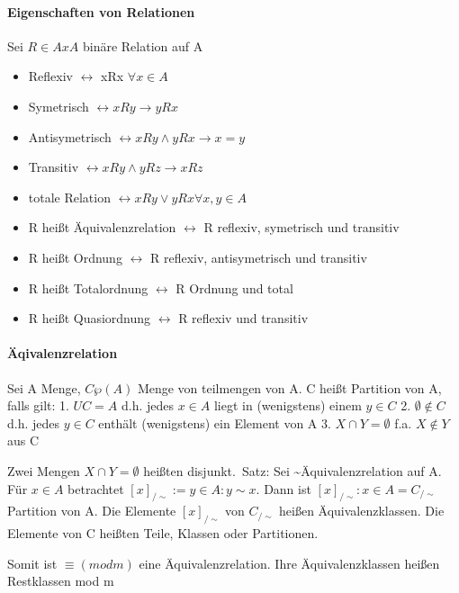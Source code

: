 \documentclass[10pt,landscape]{article}
\begin{document}
\begin{multicols}{3}
\paragraph{Eigenschaften von Relationen}
Sei $R\in AxA$ binäre Relation auf A
\begin{itemize}
    \item Reflexiv $\leftrightarrow$ xRx $\forall x \in A$
    \item Symetrisch $\leftrightarrow xRy \rightarrow yRx$
    \item Antisymetrisch $\leftrightarrow xRy \wedge yRx \rightarrow x=y$
    \item Transitiv $\leftrightarrow xRy \wedge yRz \rightarrow xRz$
    \item totale Relation $\leftrightarrow xRy \vee yRx  \forall x,y \in A$
\end{itemize}
\begin{itemize}
    \item R heißt Äquivalenzrelation $\leftrightarrow$ R reflexiv, symetrisch und transitiv
    \item R heißt Ordnung $\leftrightarrow$ R reflexiv, antisymetrisch und transitiv
    \item R heißt Totalordnung $\leftrightarrow$ R Ordnung und total
    \item R heißt Quasiordnung $\leftrightarrow$ R reflexiv und transitiv
\end{itemize}

\paragraph{Äqivalenzrelation}
Sei A Menge, $C\wp (A)$ Menge von teilmengen von A. C heißt Partition von A, falls gilt:
1. $UC=A$ d.h. jedes $x\in A$ liegt in (wenigstens) einem $y\in C$
2. $\emptyset \not \in C$ d.h. jedes $y\in C$ enthält (wenigstens) ein Element von A
3. $X \cap Y = \emptyset$ f.a. $X\not \in Y$ aus C

Zwei Mengen $X\cap Y = \emptyset$ heißten disjunkt.\
Satz: Sei \sim  Äquivalenzrelation auf A. Für $x\in A$ betrachtet $[x]_{/\sim }:={y\in A: y\sim x}$. Dann ist ${[x]_{/\sim }:x\in A}= C_{/\sim }$ Partition von A. Die Elemente $[x]_{/\sim }$ von $C_{/\sim }$ heißen Äquivalenzklassen. Die Elemente von C heißten Teile, Klassen oder Partitionen.

Somit ist $\equiv(mod m)$ eine Äquivalenzrelation. Ihre Äquivalenzklassen heißen Restklassen mod m


\end{multicols}
\end{document}
